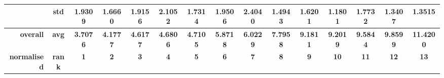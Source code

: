 \begin{table}[H]
{\begin{tabular}{rcccc|c|c|c|c|c|ccccc}
			                                                                               & std                                    & 1.9309                                                                             & 1.6660                                                                    & 1.9156                                                                    & 2.1052                                         & 1.7314                                                                    & 1.9506                                       & 2.4040                                      & 1.4943                                         & 1.6201                                         & 1.1801                                          & 1.7732                                          & 1.3407                                         & 1.3515                                         \\
			\midrule
			\textbf{overall}                                                               & \textbf{avg}                           & \cellcolor[rgb]{ .776,  .937,  .808}\textcolor[rgb]{ 0,  .38,  0}{\textbf{3.7076}} & \textbf{4.1777}                                                           & \textbf{4.6177}                                                           & \textbf{4.6806}                                & \textbf{4.7105}                                                           & \textbf{5.8718}                              & \textbf{6.0229}                             & \textbf{7.7958}                                & \textbf{9.1811}                                & \textbf{9.2019}                                 & \textbf{9.5844}                                 & \textbf{9.8599}                                & \textbf{11.4200}                               \\
			\textbf{normalised}                                                            & \textbf{rank}                          & \cellcolor[rgb]{ .388,  .745,  .482}\textbf{1}                                     & \cellcolor[rgb]{ .49,  .773,  .486}\textbf{2}                             & \cellcolor[rgb]{ .592,  .804,  .494}\textbf{3}                            & \cellcolor[rgb]{ .694,  .831,  .498}\textbf{4} & \cellcolor[rgb]{ .796,  .863,  .506}\textbf{5}                            & \cellcolor[rgb]{ .898,  .89,  .51}\textbf{6} & \cellcolor[rgb]{ 1,  .922,  .518}\textbf{7} & \cellcolor[rgb]{ .996,  .839,  .502}\textbf{8} & \cellcolor[rgb]{ .992,  .753,  .486}\textbf{9} & \cellcolor[rgb]{ .988,  .667,  .471}\textbf{10} & \cellcolor[rgb]{ .984,  .584,  .455}\textbf{11} & \cellcolor[rgb]{ .98,  .498,  .439}\textbf{12} & \cellcolor[rgb]{ .973,  .412,  .42}\textbf{13} \\
			\cmidrule{6-6}\cmidrule{8-8}\cmidrule{10-10}\end{tabular}%
	}
\end{table}%

